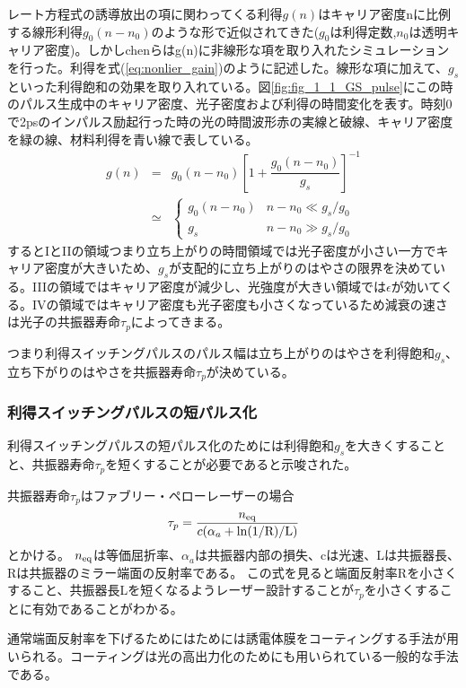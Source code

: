 レート方程式の誘導放出の項に関わってくる利得$g(n)$はキャリア密度nに比例する線形利得$g_{0}(n-n_{0})$のような形で近似されてきた($g_{0}$は利得定数,$n_{0}$は透明キャリア密度)。しかしchenらはg(n)に非線形な項を取り入れたシミュレーションを行った。利得を式(\ref{eq:nonlier_gain})のように記述した。線形な項に加えて、$g_{s}$といった利得飽和の効果を取り入れている。図\ref{fig:fig_1_1_GS_pulse}にこの時のパルス生成中のキャリア密度、光子密度および利得の時間変化を表す。時刻0で2psのインパルス励起行った時の光の時間波形赤の実線と破線、キャリア密度を緑の線、材料利得を青い線で表している。
\begin{eqnarray}
g(n)&=&g_{0}(n-n_{0})\left[1+\dfrac{g_{0}(n-n_{0})}{g_{s}}\right]^{-1}\\
\label{eq:nonlier_gain}
&\simeq &\left\{
\begin{array}{ll}
 g_{0}(n-n_{0}) & n-n_{0}\ll g_{s}/g_{0}\nonumber \\
g_{s} & n-n_{0}\gg g_{s}/g_{0}\nonumber
\end{array}
\right.
\end{eqnarray}
するとIとIIの領域つまり立ち上がりの時間領域では光子密度が小さい一方でキャリア密度が大きいため、$g_{s}$が支配的に立ち上がりのはやさの限界を決めている。IIIの領域ではキャリア密度が減少し、光強度が大きい領域では$\epsilon$が効いてくる。IVの領域ではキャリア密度も光子密度も小さくなっているため減衰の速さは光子の共振器寿命$\tau_{p}$によってきまる。

つまり利得スイッチングパルスのパルス幅は立ち上がりのはやさを利得飽和$g_{s}$、立ち下がりのはやさを共振器寿命$\tau_{p}$が決めている。
\newpage

\subsubsection{利得スイッチングパルスの短パルス化}
利得スイッチングパルスの短パルス化のためには利得飽和$g_{s}$を大きくすることと、共振器寿命$\tau_{p}$を短くすることが必要であると示唆された。

共振器寿命$\tau_{p}$はファブリー・ペローレーザーの場合
\begin{eqnarray}
\tau_{p}=\dfrac{n_{\rm{eq}}}{c(\alpha_{a}+\rm{ln}(1/R)/L)}
\end{eqnarray}
とかける\cite{ref_iga}。
$n_{\rm{eq}}$は等価屈折率、$\alpha_{a}$は共振器内部の損失、cは光速、Lは共振器長、Rは共振器のミラー端面の反射率である。
この式を見ると端面反射率Rを小さくすること、共振器長Lを短くなるようレーザー設計することが$\tau_{p}$を小さくすることに有効であることがわかる。

通常端面反射率を下げるためにはためには誘電体膜をコーティングする手法が用いられる。コーティングは光の高出力化のためにも用いられている一般的な手法である。

